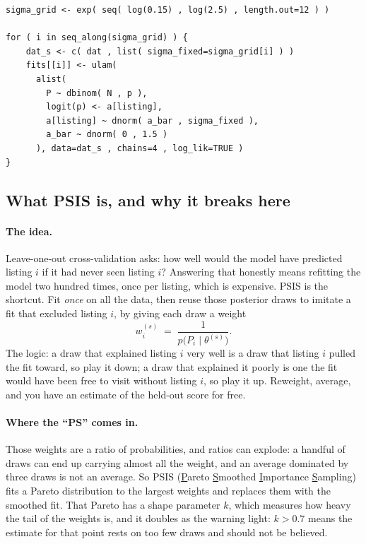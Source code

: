 \documentclass[11pt,a4paper]{article}
\begin{document}
\begin{lstlisting}
sigma_grid <- exp( seq( log(0.15) , log(2.5) , length.out=12 ) )

for ( i in seq_along(sigma_grid) ) {
    dat_s <- c( dat , list( sigma_fixed=sigma_grid[i] ) )
    fits[[i]] <- ulam(
      alist(
        P ~ dbinom( N , p ),
        logit(p) <- a[listing],
        a[listing] ~ dnorm( a_bar , sigma_fixed ),
        a_bar ~ dnorm( 0 , 1.5 )
      ), data=dat_s , chains=4 , log_lik=TRUE )
}
\end{lstlisting}

\subsection{What PSIS is, and why it breaks here}

\paragraph{The idea.} Leave-one-out cross-validation asks: how well would the
model have predicted listing $i$ if it had never seen listing $i$? Answering
that honestly means refitting the model two hundred times, once per listing,
which is expensive. PSIS is the shortcut. Fit \emph{once} on all the data, then
reuse those posterior draws to imitate a fit that excluded listing $i$, by
giving each draw a weight
\[
  w_i^{(s)} \;=\; \frac{1}{p\big(P_i \mid \theta^{(s)}\big)} .
\]
The logic: a draw that explained listing $i$ very well is a draw that listing
$i$ pulled the fit toward, so play it down; a draw that explained it poorly is
one the fit would have been free to visit without listing $i$, so play it up.
Reweight, average, and you have an estimate of the held-out score for free.

\paragraph{Where the ``PS'' comes in.} Those weights are a ratio of
probabilities, and ratios can explode: a handful of draws can end up carrying
almost all the weight, and an average dominated by three draws is not an average.
So PSIS (\underline{P}areto \underline{S}moothed \underline{I}mportance
\underline{S}ampling) fits a Pareto distribution to the largest weights and
replaces them with the smoothed fit. That Pareto has a shape parameter $k$,
which measures how heavy the tail of the weights is, and it doubles as the
warning light: $k > 0.7$ means the estimate for that point rests on too few
draws and should not be believed.
\end{document}
